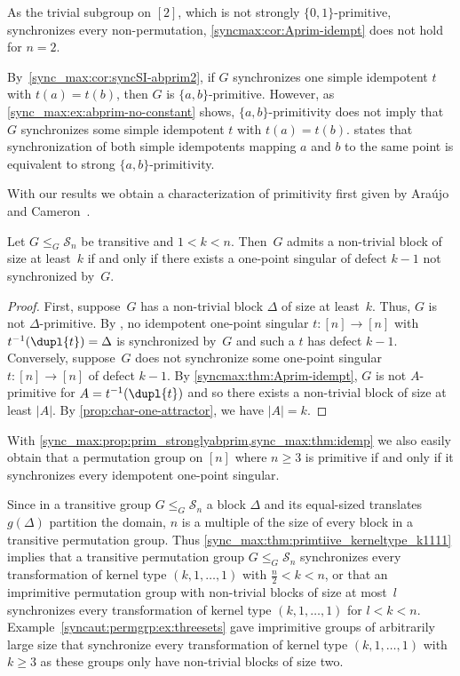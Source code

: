 As the trivial subgroup on $[2]$, which is not strongly $\{0,1\}$-primitive,
synchronizes every non-permutation,
\cref{syncmax:cor:Aprim-idempt} does not hold for $n = 2$.

By~\cref{sync_max:cor:syncSI-abprim2}, 
if $G$ synchronizes one simple idempotent $t$
with $t(a) = t(b)$, 
then $G$ is $\{a,b\}$-primitive.
However, as \cref{sync_max:ex:abprim-no-constant}
shows, $\{a,b\}$-primitivity
does not imply that $G$
synchronizes some simple idempotent $t$
with $t(a) = t(b)$.
states that synchronization of both simple idempotents
mapping $a$ and $b$ to the same
point is equivalent to strong $\{a,b\}$-primitivity.

With our results we obtain a characterization of primitivity first given by 
Ara\'ujo and Cameron~\cite[Thm.~2]{AraujoCameron2014}.

\begin{corollary} \label{sync_max:thm:primtiive_kerneltype_k1111}
 Let $G \le_G \mathcal S_n$ be transitive and $1 < k < n$. Then~$G$ admits a non-trivial block of size at least~$k$
 if and only if there exists a one-point singular of defect $k - 1$ not synchronized by~$G$.
\end{corollary}
\begin{proof}
 First, suppose~$G$ has a non-trivial block $\Delta$ of size at least~$k$.
 Thus, $G$ is not $\Delta$-primitive.
 By , 
 no idempotent one-point singular $t \colon [n] \to [n]$
 with $t^{-1}(\dupl{t}) = \Delta$
 is synchronized by~$G$
 and such a $t$ has defect $k - 1$.
 Conversely, suppose~$G$ does not synchronize some one-point singular $t \colon [n] \to [n]$ 
 of defect $k - 1$. By \cref{syncmax:thm:Aprim-idempt},
 $G$ is not $A$-primitive for $A = t^{-1}(\dupl{t})$
 and so there exists a non-trivial block
 of size at least $|A|$. By \cref{prop:char-one-attractor}, we have $|A| = k$.
\end{proof}

With \cref{sync_max:prop:prim_stronglyabprim,sync_max:thm:idemp} we also easily obtain
that a permutation group on $[n]$ where $n \ge 3$ is primitive
if and only if it synchronizes every idempotent one-point singular.

Since in a transitive group $G \le_G \mathcal S_n$
a block $\Delta$ and its equal-sized translates $g(\Delta)$
partition the domain, $n$ is a multiple of the size of every block
in a transitive permutation group. Thus \cref{sync_max:thm:primtiive_kerneltype_k1111} 
implies that a transitive
permutation group $G \le_G \mathcal S_n$ 
synchronizes every transformation
of kernel type $(k,1,\ldots,1)$
with $\frac{n}{2} < k < n$,
or that an imprimitive permutation group
with non-trivial blocks of size at most~$l$
synchronizes every transformation of kernel type $(k,1,\ldots,1)$
for $l < k < n$.
Example~\ref{syncaut:permgrp:ex:threesets}
gave imprimitive groups of arbitrarily large size that synchronize
every transformation of kernel type $(k,1,\ldots,1)$ with $k \ge 3$
as these groups only have non-trivial blocks of size two.

